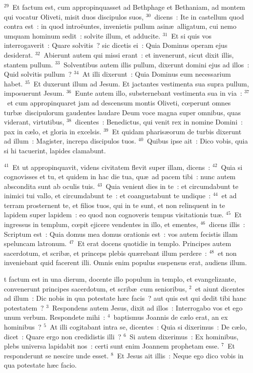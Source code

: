 ${}^{29}$~Et factum est, cum appropinquasset ad Bethphage et Bethaniam, ad montem qui vocatur Oliveti, misit duos discipulos suos,
${}^{30}$~dicens~: Ite in castellum quod contra est~: in quod intro\"euntes, invenietis pullum asin\ae\ alligatum, cui nemo umquam hominum sedit~: solvite illum, et adducite.
${}^{31}$~Et si quis vos interrogaverit~: Quare solvitis~? sic dicetis ei~: Quia Dominus operam ejus desiderat.
${}^{32}$~Abierunt autem qui missi erant~: et invenerunt, sicut dixit illis, stantem pullum.
${}^{33}$~Solventibus autem illis pullum, dixerunt domini ejus ad illos~: Quid solvitis pullum~?
${}^{34}$~At illi dixerunt~: Quia Dominus eum necessarium habet.
${}^{35}$~Et duxerunt illum ad Jesum. Et jactantes vestimenta sua supra pullum, imposuerunt Jesum.
${}^{36}$~Eunte autem illo, substernebant vestimenta sua in via~:
${}^{37}$~et cum appropinquaret jam ad descensum montis Oliveti, cœperunt omnes turb\ae\ discipulorum gaudentes laudare Deum voce magna super omnibus, quas viderant, virtutibus,
${}^{38}$~dicentes~: Benedictus, qui venit rex in nomine Domini~: pax in c\ae lo, et gloria in excelsis.
${}^{39}$~Et quidam pharis\ae orum de turbis dixerunt ad illum~: Magister, increpa discipulos tuos.
${}^{40}$~Quibus ipse ait~: Dico vobis, quia si hi tacuerint, lapides clamabunt.


${}^{41}$~Et ut appropinquavit, videns civitatem flevit super illam, dicens~:
${}^{42}$~Quia si cognovisses et tu, et quidem in hac die tua, qu\ae\ ad pacem tibi~: nunc autem abscondita sunt ab oculis tuis.
${}^{43}$~Quia venient dies in te~: et circumdabunt te inimici tui vallo, et circumdabunt te~: et coangustabunt te undique~:
${}^{44}$~et ad terram prosternent te, et filios tuos, qui in te sunt, et non relinquent in te lapidem super lapidem~: eo quod non cognoveris tempus visitationis tu\ae .
${}^{45}$~Et ingressus in templum, cœpit ejicere vendentes in illo, et ementes,
${}^{46}$~dicens illis~: Scriptum est~: Quia domus mea domus orationis est~: vos autem fecistis illam speluncam latronum.
${}^{47}$~Et erat docens quotidie in templo. Principes autem sacerdotum, et scrib\ae , et princeps plebis qu\ae rebant illum perdere~:
${}^{48}$~et non inveniebant quid facerent illi. Omnis enim populus suspensus erat, audiens illum.

\bchapter
{}t factum est in una dierum, docente illo populum in templo, et evangelizante, convenerunt principes sacerdotum, et scrib\ae\ cum senioribus,
${}^{2}$~et aiunt dicentes ad illum~: Dic nobis in qua potestate h\ae c facis~? aut quis est qui dedit tibi hanc potestatem~?
${}^{3}$~Respondens autem Jesus, dixit ad illos~: Interrogabo vos et ego unum verbum. Respondete mihi~:
${}^{4}$~baptismus Joannis de c\ae lo erat, an ex hominibus~?
${}^{5}$~At illi cogitabant intra se, dicentes~: Quia si dixerimus~: De c\ae lo, dicet~: Quare ergo non credidistis illi~?
${}^{6}$~Si autem dixerimus~: Ex hominibus, plebs universa lapidabit nos~: certi sunt enim Joannem prophetam esse.
${}^{7}$~Et responderunt se nescire unde esset.
${}^{8}$~Et Jesus ait illis~: Neque ego dico vobis in qua potestate h\ae c facio.


